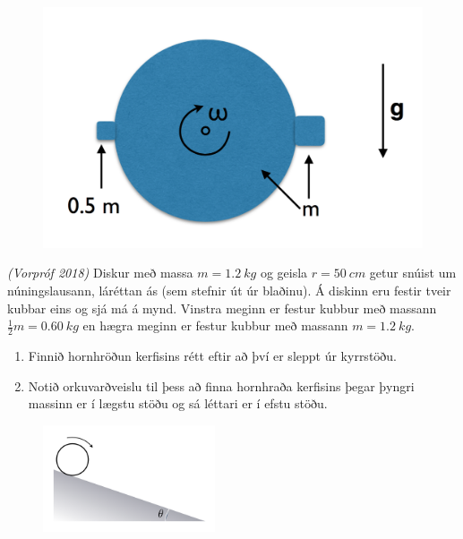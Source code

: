 \begin{enumerate}[label = \textbf{Dæmi \thechapter.\arabic*.}]
\begin{minipage}{\linewidth}
\begin{figure}
\vspace{-1.25cm}
\includegraphics[scale = 0.25]{images/snuens.png}
\end{figure}

\item \textit{(Vorpróf 2018)} Diskur með massa $m = \SI{1.2}{kg}$ og geisla $r = \SI{50}{cm}$ getur snúist um núningslausann, láréttan ás (sem stefnir út úr blaðinu). Á diskinn eru festir tveir kubbar eins og sjá má á mynd. Vinstra meginn er festur kubbur með massann $\frac{1}{2}m = \SI{0.60}{kg}$ en hægra meginn er festur kubbur með massann $m = \SI{1.2}{kg}$.
\end{minipage}

\begin{enumerate}[label = \textbf{(\alph*)}]
    \item Finnið hornhröðun kerfisins rétt eftir að því er sleppt úr kyrrstöðu.
    \item Notið orkuvarðveislu til þess að finna hornhraða kerfisins þegar þyngri massinn er í lægstu stöðu og sá léttari er í efstu stöðu.
\end{enumerate}

\begin{minipage}{\linewidth}

\begin{figure}
\vspace{-0.5cm}
\includegraphics[width=2in]{images/rulla.png}
\end{figure}



\end{minipage}
\end{enumerate}
